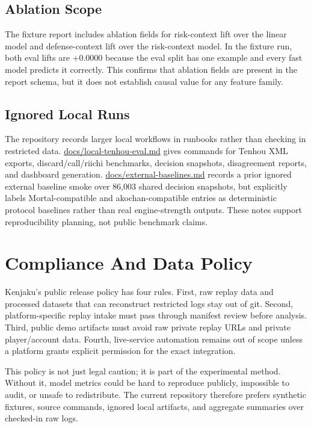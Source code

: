 \documentclass[11pt]{article}
\begin{document}
\subsection{Ablation Scope}

The fixture report includes ablation fields for risk-context lift over the linear model and
defense-context lift over the risk-context model. In the fixture run, both eval lifts are +0.0000
because the eval split has one example and every fast model predicts it correctly. This confirms
that ablation fields are present in the report schema, but it does not establish causal value for
any feature family.

\subsection{Ignored Local Runs}

The repository records larger local workflows in runbooks rather than checking in restricted data.
\href{../local-tenhou-eval.md}{docs/local-tenhou-eval.md} gives commands for Tenhou XML exports,
discard/call/riichi benchmarks, decision snapshots, disagreement reports, and dashboard generation.
\href{../external-baselines.md}{docs/external-baselines.md} records a prior ignored external
baseline smoke over 86,003 shared decision snapshots, but explicitly labels Mortal-compatible and
akochan-compatible entries as deterministic protocol baselines rather than real engine-strength
outputs. These notes support reproducibility planning, not public benchmark claims.

\section{Compliance And Data Policy}

Kenjaku's public release policy has four rules. First, raw replay data and processed datasets that
can reconstruct restricted logs stay out of git. Second, platform-specific replay intake must pass
through manifest review before analysis. Third, public demo artifacts must avoid raw private replay
URLs and private player/account data. Fourth, live-service automation remains out of scope unless a
platform grants explicit permission for the exact integration.

This policy is not just legal caution; it is part of the experimental method. Without it, model
metrics could be hard to reproduce publicly, impossible to audit, or unsafe to redistribute. The
current repository therefore prefers synthetic fixtures, source commands, ignored local artifacts,
and aggregate summaries over checked-in raw logs.
\end{document}
